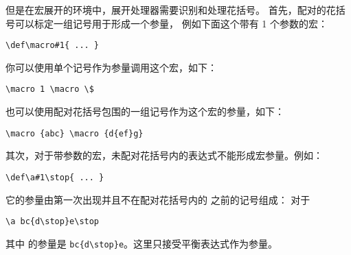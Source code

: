 \documentclass{book}
\begin{document}
但是在宏展开的环境中，展开处理器需要识别和处理花括号。
首先，配对的花括号可以标定一组记号用于形成一个参量，
例如下面这个带有 1 个参数的宏：
\begin{verbatim}
\def\macro#1{ ... }
\end{verbatim}
你可以使用单个记号作为参量调用这个宏，如下：
\begin{verbatim}
\macro 1 \macro \$
\end{verbatim}
也可以使用配对花括号包围的一组记号作为这个宏的参量，如下：
\begin{verbatim}
\macro {abc} \macro {d{ef}g}
\end{verbatim}

其次，对于带参数的宏，未配对花括号内的表达式不能形成宏参量。例如：
\begin{verbatim}
\def\a#1\stop{ ... }
\end{verbatim}
它的参量由第一次出现并且不在配对花括号内的  之前的记号组成：
对于
\begin{verbatim}
\a bc{d\stop}e\stop
\end{verbatim}
其中  的参量是 \verb>bc{d\stop}e>。这里只接受平衡表达式作为参量。

\end{document}
